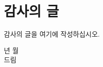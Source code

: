   \chapter*{감사의 글}
  감사의 글을 여기에 작성하십시오.
  \vspace{20mm}
  \begin{flushright}
    \printsubmityear 년 \printsubmitmonth 월 \\[5pt]
    \printauthorname 드림
  \end{flushright}
